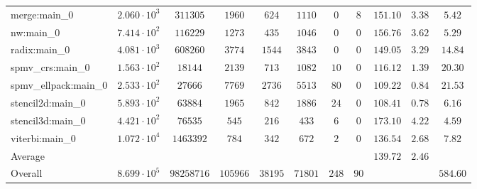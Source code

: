 \begin{tabular}{|l|c|c|c|c|c|c|c|c|c|c|}
merge:main\_0          & $ 2.060 \cdot 10^{3} $ & $ 311305   $ & $ 1960   $ & $ 624   $ & $ 1110  $ & $ 0   $ & $ 8  $ & $ 151.10      $ & $ 3.38    $ & $ 5.42    $ \\
nw:main\_0             & $ 7.414 \cdot 10^{2} $ & $ 116229   $ & $ 1273   $ & $ 435   $ & $ 1046  $ & $ 0   $ & $ 0  $ & $ 156.76      $ & $ 3.62    $ & $ 5.29    $ \\
radix:main\_0          & $ 4.081 \cdot 10^{3} $ & $ 608260   $ & $ 3774   $ & $ 1544  $ & $ 3843  $ & $ 0   $ & $ 0  $ & $ 149.05      $ & $ 3.29    $ & $ 14.84   $ \\
spmv\_crs:main\_0      & $ 1.563 \cdot 10^{2} $ & $ 18144    $ & $ 2139   $ & $ 713   $ & $ 1082  $ & $ 10  $ & $ 0  $ & $ 116.12      $ & $ 1.39    $ & $ 20.30   $ \\
spmv\_ellpack:main\_0  & $ 2.533 \cdot 10^{2} $ & $ 27666    $ & $ 7769   $ & $ 2736  $ & $ 5513  $ & $ 80  $ & $ 0  $ & $ 109.22      $ & $ 0.84    $ & $ 21.53   $ \\
stencil2d:main\_0      & $ 5.893 \cdot 10^{2} $ & $ 63884    $ & $ 1965   $ & $ 842   $ & $ 1886  $ & $ 24  $ & $ 0  $ & $ 108.41      $ & $ 0.78    $ & $ 6.16    $ \\
stencil3d:main\_0      & $ 4.421 \cdot 10^{2} $ & $ 76535    $ & $ 545    $ & $ 216   $ & $ 433   $ & $ 6   $ & $ 0  $ & $ 173.10      $ & $ 4.22    $ & $ 4.59    $ \\
viterbi:main\_0        & $ 1.072 \cdot 10^{4} $ & $ 1463392  $ & $ 784    $ & $ 342   $ & $ 672   $ & $ 2   $ & $ 0  $ & $ 136.54      $ & $ 2.68    $ & $ 7.82    $ \\
\hline
Average                & $                    $ & $          $ & $        $ & $       $ & $       $ & $     $ & $    $ & $ 139.72      $ & $ 2.46    $ & $         $ \\
\hline
Overall                & $ 8.699 \cdot 10^{5} $ & $ 98258716 $ & $ 105966 $ & $ 38195 $ & $ 71801 $ & $ 248 $ & $ 90 $ & $             $ & $         $ & $ 584.60  $ \\
\hline
\end{tabular}

